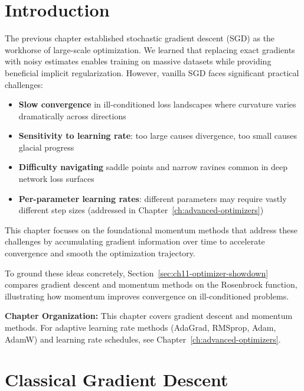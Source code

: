 \documentclass[../../main.tex]{subfiles}
\begin{document}
\section{Introduction}
\label{sec:ch11-intro}

The previous chapter established stochastic gradient descent (SGD) as the workhorse of large-scale optimization. We learned that replacing exact gradients with noisy estimates enables training on massive datasets while providing beneficial implicit regularization. However, vanilla SGD faces significant practical challenges:

\begin{itemize}
    \item \textbf{Slow convergence} in ill-conditioned loss landscapes where curvature varies dramatically across directions
    \item \textbf{Sensitivity to learning rate}: too large causes divergence, too small causes glacial progress
    \item \textbf{Difficulty navigating} saddle points and narrow ravines common in deep network loss surfaces
    \item \textbf{Per-parameter learning rates}: different parameters may require vastly different step sizes (addressed in Chapter~\ref{ch:advanced-optimizers})
\end{itemize}

This chapter focuses on the foundational momentum methods that address these challenges by accumulating gradient information over time to accelerate convergence and smooth the optimization trajectory.

To ground these ideas concretely, Section~\ref{sec:ch11-optimizer-showdown} compares gradient descent and momentum methods on the Rosenbrock function, illustrating how momentum improves convergence on ill-conditioned problems.

\begin{important}
\textbf{Chapter Organization:} This chapter covers gradient descent and momentum methods. For adaptive learning rate methods (AdaGrad, RMSprop, Adam, AdamW) and learning rate schedules, see Chapter~\ref{ch:advanced-optimizers}.
\end{important}

\section{Classical Gradient Descent}
\label{sec:ch11-classical-gd}
\end{document}
